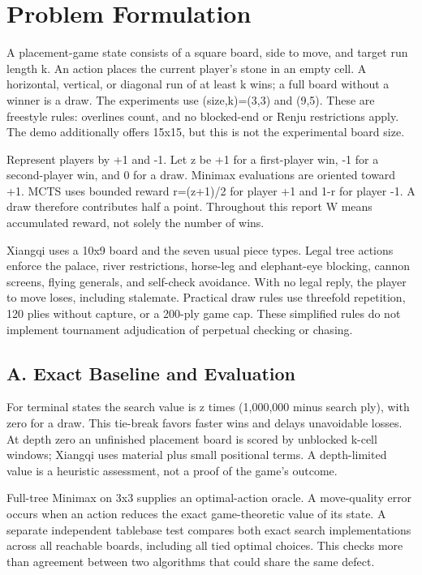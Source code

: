 \documentclass[conference]{IEEEtran}
\begin{document}
\section{Problem Formulation}

A placement-game state consists of a square board, side to move, and target run length k. An action places the current player's stone in an empty cell. A horizontal, vertical, or diagonal run of at least k wins; a full board without a winner is a draw. The experiments use (size,k)=(3,3) and (9,5). These are freestyle rules: overlines count, and no blocked-end or Renju restrictions apply. The demo additionally offers 15x15, but this is not the experimental board size.


Represent players by +1 and -1. Let z be +1 for a first-player win, -1 for a second-player win, and 0 for a draw. Minimax evaluations are oriented toward +1. MCTS uses bounded reward r=(z+1)/2 for player +1 and 1-r for player -1. A draw therefore contributes half a point. Throughout this report W means accumulated reward, not solely the number of wins.


Xiangqi uses a 10x9 board and the seven usual piece types. Legal tree actions enforce the palace, river restrictions, horse-leg and elephant-eye blocking, cannon screens, flying generals, and self-check avoidance. With no legal reply, the player to move loses, including stalemate. Practical draw rules use threefold repetition, 120 plies without capture, or a 200-ply game cap. These simplified rules do not implement tournament adjudication of perpetual checking or chasing.


\subsection{A. Exact Baseline and Evaluation}

For terminal states the search value is z times (1,000,000 minus search ply), with zero for a draw. This tie-break favors faster wins and delays unavoidable losses. At depth zero an unfinished placement board is scored by unblocked k-cell windows; Xiangqi uses material plus small positional terms. A depth-limited value is a heuristic assessment, not a proof of the game's outcome.


Full-tree Minimax on 3x3 supplies an optimal-action oracle. A move-quality error occurs when an action reduces the exact game-theoretic value of its state. A separate independent tablebase test compares both exact search implementations across all reachable boards, including all tied optimal choices. This checks more than agreement between two algorithms that could share the same defect.
\end{document}

